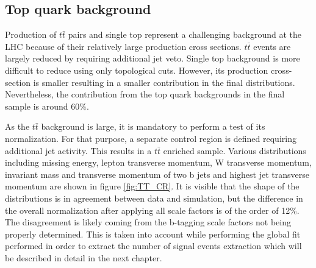 \subsection{Top quark background}

Production of $t\bar{t}$ pairs and single top represent a challenging background at the LHC because of their relatively large production cross sections. $t\bar{t}$ events are largely reduced by requiring additional jet veto. Single top background is more difficult to reduce using only topological cuts. However, its production cross-section is smaller resulting in a smaller contribution in the final distributions. Nevertheless, the contribution from the top quark backgrounds in the final sample is around 60$\%$.
\par As the $t\bar{t}$ background is large, it is mandatory to perform a test of its normalization. For that purpose, a separate control region is defined requiring additional jet activity. This results in a $t\bar{t}$ enriched sample. Various distributions including missing energy, lepton transverse momentum, W transverse momentum, invariant mass and transverse momentum of two b jets and highest jet transverse momentum are shown in figure \ref{fig:TT_CR}. It is visible that the shape of the distributions is in agreement between data and simulation, but the difference in the overall normalization after applying all scale factors is of the order of 12$\%$. The disagreement is likely coming from the b-tagging scale factors not being properly determined. This is taken into account while performing the global fit performed in order to extract the number of signal events extraction which will be described in detail in the next chapter. 
